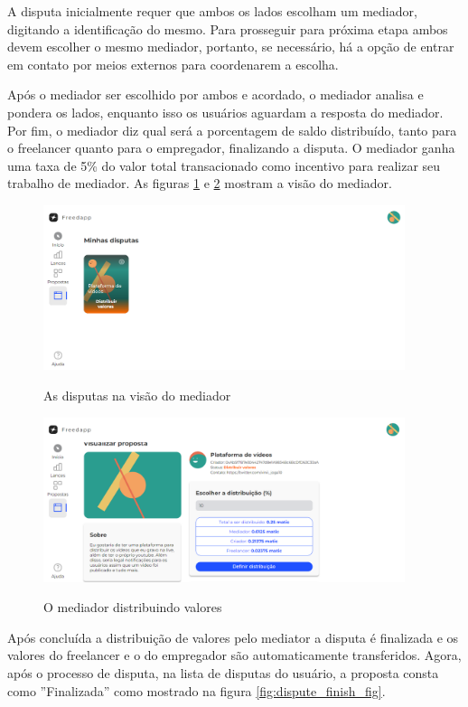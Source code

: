 A disputa inicialmente requer que ambos os lados escolham um mediador, digitando a identificação do mesmo. Para prosseguir para próxima etapa ambos devem escolher o mesmo mediador, portanto, se necessário, há a opção de entrar em contato por meios externos para coordenarem a escolha.

Após o mediador ser escolhido por ambos e acordado, o mediador analisa e pondera os lados, enquanto isso os usuários aguardam a resposta do mediador. Por fim, o mediador diz qual será a porcentagem de saldo distribuído, tanto para o freelancer quanto para o empregador, finalizando a disputa. O mediador ganha uma taxa de 5\% do valor total transacionado como incentivo para realizar seu trabalho de mediador. As figuras \ref{fig:dispute_mediator_list_fig} e \ref{fig:dispute_mediator_values_fig} mostram a visão do mediador.

\begin{figure}[!h]
  \centering
  \caption{As disputas na visão do mediador}
  \includegraphics[width=400px]{src/images/app/dispute_mediator_list.PNG}
  \label{fig:dispute_mediator_list_fig}
\end{figure}

\begin{figure}[!h]
  \centering
  \caption{O mediador distribuindo valores}
  \includegraphics[width=400px]{src/images/app/dispute_mediator_values.PNG}
  \label{fig:dispute_mediator_values_fig}
\end{figure}

Após concluída a distribuição de valores pelo mediator a disputa é finalizada e os valores do freelancer e o do empregador são automaticamente transferidos. Agora, após o processo de disputa, na lista de disputas do usuário, a proposta consta como ''Finalizada'' como mostrado na figura \ref{fig:dispute_finish_fig}.

